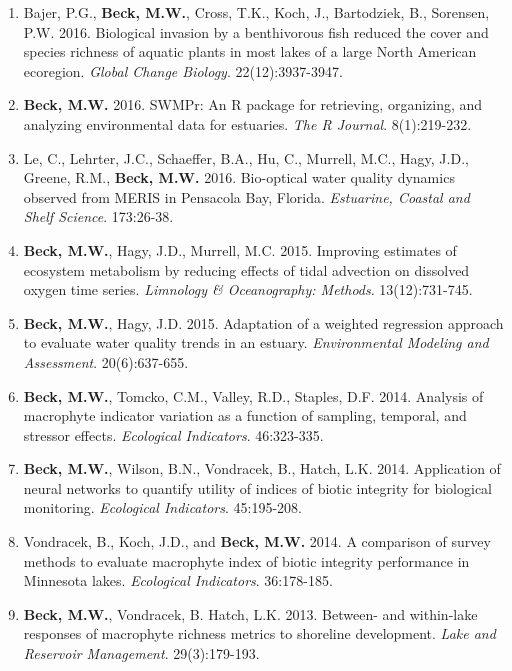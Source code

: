 \documentclass[letterpaper,12pt]{article}
\begin{document}
\begin{enumerate}
\item Bajer, P.G., \textbf{Beck, M.W.}, Cross, T.K., Koch, J., Bartodziek, B., Sorensen, P.W. 2016. Biological invasion by a benthivorous fish reduced the cover and species richness of aquatic plants in most lakes of a large North American ecoregion. \textit{Global Change Biology}. 22(12):3937-3947. 

\item \textbf{Beck, M.W.} 2016. SWMPr: An R package for retrieving, organizing, and analyzing environmental data for estuaries. \textit{The R Journal}. 8(1):219-232.

\item Le, C., Lehrter, J.C., Schaeffer, B.A., Hu, C., Murrell, M.C., Hagy, J.D., Greene, R.M., \textbf{Beck, M.W.} 2016. Bio-optical water quality dynamics observed from MERIS in Pensacola Bay, Florida. \textit{Estuarine, Coastal and Shelf Science}. 173:26-38.

\item \textbf{Beck, M.W.}, Hagy, J.D., Murrell, M.C. 2015. Improving estimates of ecosystem metabolism by reducing effects of tidal advection on dissolved oxygen time series. \textit{Limnology \& Oceanography: Methods}. 13(12):731-745.

\item \textbf{Beck, M.W.}, Hagy, J.D. 2015. Adaptation of a weighted regression approach to evaluate water quality trends in an estuary. \textit{Environmental Modeling and Assessment}. 20(6):637-655.

\item \textbf{Beck, M.W.}, Tomcko, C.M., Valley, R.D., Staples, D.F. 2014. Analysis of macrophyte indicator variation as a function of sampling, temporal, and stressor effects. \textit{Ecological Indicators}. 46:323-335.

\item \textbf{Beck, M.W.}, Wilson, B.N., Vondracek, B., Hatch, L.K. 2014. Application of neural networks to quantify utility of indices of biotic integrity for biological monitoring. \textit{Ecological Indicators}. 45:195-208.

\item Vondracek, B., Koch, J.D., and \textbf{Beck, M.W.} 2014. A comparison of survey methods to evaluate macrophyte index of biotic integrity performance in Minnesota lakes. \textit{Ecological Indicators}. 36:178-185.

\item \textbf{Beck, M.W.}, Vondracek, B. Hatch, L.K. 2013. Between- and within-lake responses of macrophyte richness metrics to shoreline development. \textit{Lake and Reservoir Management}. 29(3):179-193.


\end{enumerate}
\end{document}
